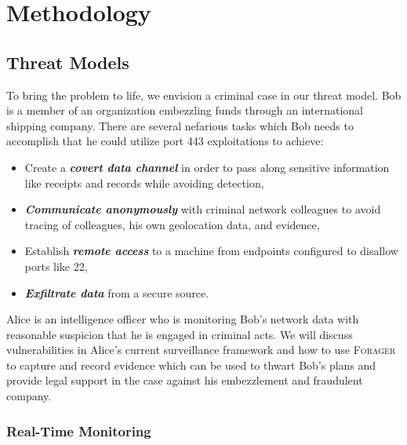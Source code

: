 \section{Methodology}

\subsection{Threat Models}
To bring the problem to life, we envision a criminal case in our threat model. Bob is a member of an organization embezzling funds through an international shipping company. There are several nefarious tasks which Bob needs to accomplish that he could utilize port 443 exploitations to achieve:
\begin{itemize}
\item Create a \textbf{\textit{covert data channel}} in order to pass along sensitive information like receipts and records while avoiding detection,
\item \textbf{\textit{Communicate anonymously}} with criminal network colleagues to avoid tracing of colleagues, his own geolocation data, and evidence,
\item Establish \textbf{\textit{remote access}} to a machine from endpoints configured to disallow ports like 22,
\item \textbf{\textit{Exfiltrate data}} from a secure source.
\end{itemize}

Alice is an intelligence officer who is monitoring Bob's network data with reasonable suspicion that he is engaged in criminal acts. We will discuss vulnerabilities in Alice's current surveillance framework and how to use \textsc{Forager} to capture and record evidence which can be used to thwart Bob's plans and provide legal support in the case against his embezzlement and fraudulent company.

\subsubsection{Real-Time Monitoring}

